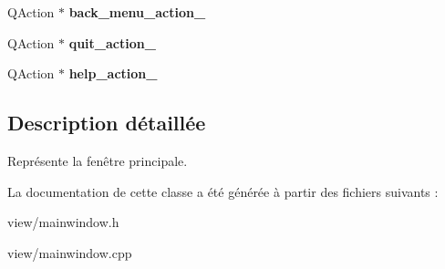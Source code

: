 \begin{DoxyCompactItemize}
\item 
\hypertarget{classMainWindow_a2bd080326948948b8137f07232712458}{Q\+Action $\ast$ {\bfseries back\+\_\+menu\+\_\+action\+\_\+}}\label{classMainWindow_a2bd080326948948b8137f07232712458}

\item 
\hypertarget{classMainWindow_a860806ffe399e1e09ba3a7e11e67ccb3}{Q\+Action $\ast$ {\bfseries quit\+\_\+action\+\_\+}}\label{classMainWindow_a860806ffe399e1e09ba3a7e11e67ccb3}

\item 
\hypertarget{classMainWindow_a570542457aa484877f34441f003b9f5e}{Q\+Action $\ast$ {\bfseries help\+\_\+action\+\_\+}}\label{classMainWindow_a570542457aa484877f34441f003b9f5e}

\end{DoxyCompactItemize}


\subsection{Description détaillée}
Représente la fenêtre principale. 

La documentation de cette classe a été générée à partir des fichiers suivants \+:\begin{DoxyCompactItemize}
\item 
view/mainwindow.\+h\item 
view/mainwindow.\+cpp\end{DoxyCompactItemize}
